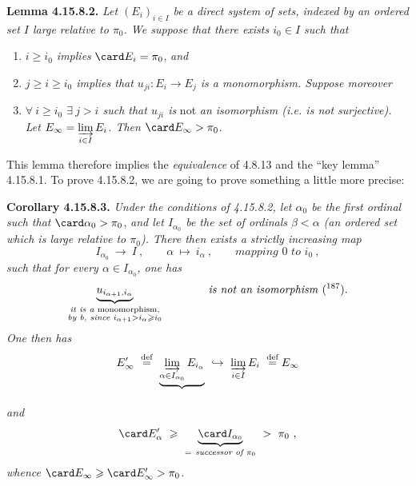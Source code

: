 \textbf{Lemma 4.15.8.2.} \textit{Let $(E_i)_{i\in I}$ be a direct system of sets, indexed by an ordered set $I$ large relative to $\pi_0$. We suppose that there exists $i_0 \in I$ such that}
\begin{enumerate}[nosep]
\item[\textit{a)}] \textit{$i \geqslant i_0$ implies} $\card E_i = \pi_0$, \textit{and}
\item[\textit{b)}] \textit{$j \geqslant i \geqslant i_0$ implies that $u_{ji} : E_i \longrightarrow E_j$ is a monomorphism. Suppose moreover}
\item[\textit{c)}] \textit{$\forall\ i \geqslant i_0$ $\exists\ j > i$ such that $u_{ji}$ is} not \textit{an isomorphism (i.e. is not surjective). Let $E_\infty = \varinjlim\limits_{i\in I} E_i$. Then} $\card E_\infty > \pi_0$.
\end{enumerate}
This lemma therefore implies the \textit{equivalence} of 4.8.13 and the ``key lemma'' 4.15.8.1. To prove 4.15.8.2, we are going to prove something a little more precise:

\textbf{Corollary 4.15.8.3.} \textit{Under the conditions of 4.15.8.2, let $\alpha_0$ be the first ordinal such that} $\card \alpha_0 > \pi_0$, \textit{and let $I_{\alpha_0}$ be the set of ordinals $\beta < \alpha$ (an ordered set which is large relative to $\pi_0$). There then exists a strictly increasing map}
\[
I_{\alpha_0} \ \longrightarrow \ I \ , \qquad \alpha \ \longmapsto \ i_\alpha \ , \qquad \textit{mapping } 0 \textit{ to } i_0 \ ,
\]
\textit{such that for every $\alpha \in I_{\alpha_0}$, one has}
\[
\underbrace{u_{i_{\alpha+1},i_\alpha}}_{\substack{\textit{it is a } \text{monomorphism,}\\ \textit{by b, since } i_{\alpha+1} > i_\alpha \geqslant i_0}} \qquad\qquad \text{\textit{is not an isomorphism} (\footnotemark[187]).}
\]
\textit{One then has}
\[
E'_\infty \ \overset{\text{def}}{=} \ \underbrace{\varinjlim_{\alpha\in I_{\alpha_0}} E_{i_\alpha}}_{} \ \hookrightarrow \ \varinjlim_{i\in I} E_i \ \overset{\text{def}}{=} E_\infty
\]
\textit{and}
\[
\card E'_\alpha \ \geqslant \ \underbrace{\card I_{\alpha_0}}_{=\ \textit{successor of } \pi_0} \ > \ \pi_0 \ ,
\] %
\textit{whence} $\card E_\infty \geqslant \card E'_\infty > \pi_0$.

